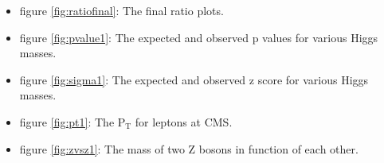 \documentclass[a4paper,12pt]{article}
\newcommand{\subscript}[1]{\ensuremath{_{\textrm{#1}}}}
\begin{document}
\begin{itemize}
	\item figure \ref{fig:ratiofinal}: The final ratio plots.
	
	\item figure \ref{fig:pvalue1}: The expected and observed p values for various Higgs masses.
	
	\item figure \ref{fig:sigma1}: The expected and observed z score for various Higgs masses.
	
	\item figure \ref{fig:pt1}: The P\subscript{T} for leptons at CMS.
	
	\item figure \ref{fig:zvsz1}: The mass of two Z bosons in function of each other.
	
\end{itemize}
	
	
	
\end{document}
